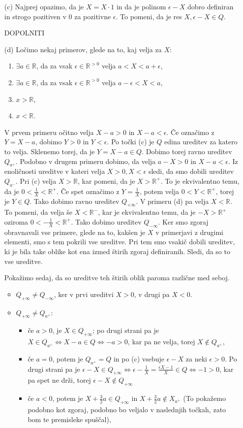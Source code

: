 \documentclass[a4paper, 12pt]{article}
\newcommand{\R}{\mathbb{R}}
\begin{document}
\begin{enumerate}
\item[(c)] Najprej opazimo, da je $X=X\cdot 1$ in da je polinom $\epsilon - X$ dobro definiran in strogo pozitiven v 0 za pozitivne $\epsilon$. To pomeni, da je res $X, \epsilon - X \in Q$.

DOPOLNITI

\item[(d)] Ločimo nekaj primerov, glede na to, kaj velja za $X$:
\begin{enumerate}
\item $\exists a \in \R$, da za vsak $\epsilon \in \R^{>0}$ velja $a < X < a+ \epsilon$,
\item $\exists a \in \R$, da za vsak $\epsilon \in \R^{>0}$ velja $a-\epsilon < X < a$,
\item $x>\R$,
\item $x<\R$.
\end{enumerate}
V prvem primeru očitno velja $X-a > 0$ in $X-a < \epsilon$. Če označimo z $Y=X-a$, dobimo $Y>0$ in $Y<\epsilon$. Po točki (c) je $Q$ edina ureditev za katero to velja. Sklenemo torej, da je $Y = X-a\in Q$. Dobimo torej ravno ureditev $Q_{a^+}$. Podobno v drugem primeru dobimo, da velja $a-X>0$ in $X-a < \epsilon$. Iz enoličnosti ureditve v kateri velja $X>0, X<\epsilon$ sledi, da smo dobili ureditev $Q_{a^-}$. Pri (c) velja $X>\R$, kar pomeni, da je $X>\R^+$. To je ekvivalentno temu, da je $0 < \frac{1}{X} < \R^+$. Če spet označimo z $Y=\frac{1}{X}$, potem velja $0 < Y < \R^+$, torej je $Y\in Q$. Tako dobimo ravno ureditev $Q_{+\infty}$. V primeru (d) pa velja $X<\R$. To pomeni, da velja še $X< \R^-$, kar je ekvivalentno temu, da je $-X > \R^+$ oziroma $0 < -\frac{1}{X} < \R^+$. Tako dobimo ureditev $Q_{-\infty}$. Ker smo zgoraj obravnavali vse primere, glede na to, kakšen je $X$ v primerjavi z drugimi elementi, smo s tem pokrili vse ureditve. Pri tem smo vsakič dobili ureditev, ki je bila take oblike kot ena izmed štirih zgoraj definiranih. Sledi, da so to vse ureditve.

Pokažimo sedaj, da so ureditve teh štirih oblik paroma različne med seboj.
\begin{itemize}
\item $Q_{+\infty} \neq Q_{-\infty}$, ker v prvi ureditvi $X>0$, v drugi pa $X<0$.

\item $Q_{+\infty}\neq Q_{a^+}$:
\begin{itemize}
\item če $a>0$, je $X\in Q_{+\infty}$; po drugi strani pa je $X\in Q_{a^+}\Leftrightarrow X-a \in Q\Leftrightarrow -a >0$, kar pa ne velja, torej $X\notin Q_{a^+}$,
\item če $a=0$, potem je $Q_{a^+} = Q$ in po (c) vsebuje $\epsilon - X$ za neki $\epsilon > 0$. Po drugi strani pa je $\epsilon - X 	\in Q_{+\infty}\Leftrightarrow \epsilon - \frac{1}{X} = \frac{\epsilon X - 1}{X} \in Q \Leftrightarrow - 1>0$, kar pa spet ne drži, torej $\epsilon - X \notin Q_{+\infty}$
\item če $a<0$, potem je $X+\frac{3}{2} a \in Q_{+\infty}$ in $X+\frac{3}{2} a \notin X_{a^+}$ (To pokažemo podobno kot zgoraj, podobno bo veljalo v naslednjih točkah, zato bom te premisleke spuščal),
\end{itemize}


\end{itemize}
\end{enumerate}
\end{document}
